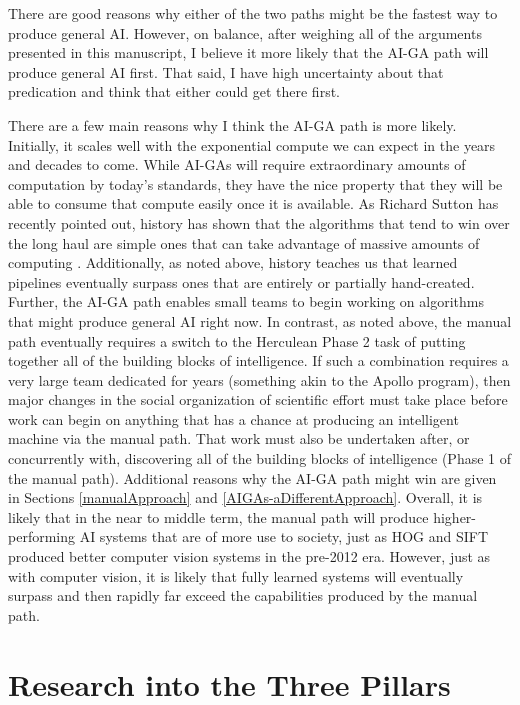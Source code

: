\documentclass{article}
\begin{document}
There are good reasons why either of the two paths might be the fastest way to produce general AI. However, on balance, after weighing all of the arguments presented in this manuscript, I believe it more likely that the AI-GA path will produce general AI first. That said, I have high uncertainty about that predication and think that either could get there first. 

There are a few main reasons why I think the AI-GA path is more likely. Initially, it scales well with the exponential compute we can expect in the years and decades to come. While AI-GAs will require extraordinary amounts of computation by today's standards, they have the nice property that they will be able to consume that compute easily once it is available. As Richard Sutton has recently pointed out, history has shown that the algorithms that tend to win over the long haul are simple ones that can take advantage of massive amounts of computing \cite{sutton2019bitter}. Additionally, as noted above, history teaches us that learned pipelines eventually surpass ones that are entirely or partially hand-created. Further, the AI-GA path enables small teams to begin working on algorithms that might produce general AI right now. In contrast, as noted above, the manual path eventually requires a switch to the Herculean Phase 2 task of putting together all of the building blocks of intelligence. 
If such a combination requires a very large team dedicated for years (something akin to the Apollo program), then major changes in the social organization of scientific effort must take place before work can begin on anything that has a chance at producing an intelligent machine via the manual path. That work must also be undertaken after, or concurrently with, discovering all of the building blocks of intelligence (Phase 1 of the manual path). 
Additional reasons why the AI-GA path might win are given in Sections \ref{manualApproach} and \ref{AIGAs-aDifferentApproach}.
Overall, it is likely that in the near to middle term, the manual path will produce higher-performing AI systems that are of more use to society, just as HOG and SIFT produced better computer vision systems in the pre-2012 era. However, just as with computer vision, it is likely that fully learned systems will eventually surpass and then rapidly far exceed the capabilities produced by the manual path. 

\section{Research into the Three Pillars}
\label{researchIntoTheThreePillars}
\end{document}
